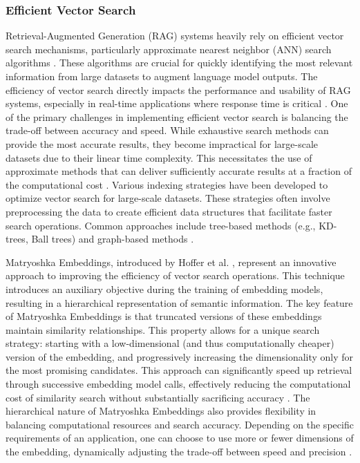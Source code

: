 \documentclass[a4paper, oneside]{discothesis}
\begin{document}
\subsubsection{Efficient Vector Search}
Retrieval-Augmented Generation (RAG) systems heavily rely on efficient vector search mechanisms, particularly approximate nearest neighbor (ANN) search algorithms \cite{johnson2019billion}. These algorithms are crucial for quickly identifying the most relevant information from large datasets to augment language model outputs. The efficiency of vector search directly impacts the performance and usability of RAG systems, especially in real-time applications where response time is critical \cite{lewis2020retrieval}.
One of the primary challenges in implementing efficient vector search is balancing the trade-off between accuracy and speed. While exhaustive search methods can provide the most accurate results, they become impractical for large-scale datasets due to their linear time complexity. This necessitates the use of approximate methods that can deliver sufficiently accurate results at a fraction of the computational cost \cite{andoni2018approximate}.
Various indexing strategies have been developed to optimize vector search for large-scale datasets. These strategies often involve preprocessing the data to create efficient data structures that facilitate faster search operations. Common approaches include tree-based methods (e.g., KD-trees, Ball trees) and graph-based methods \cite{malkov2018efficient}.

Matryoshka Embeddings, introduced by Hoffer et al. \cite{hoffer2018deep}, represent an innovative approach to improving the efficiency of vector search operations. This technique introduces an auxiliary objective during the training of embedding models, resulting in a hierarchical representation of semantic information.
The key feature of Matryoshka Embeddings is that truncated versions of these embeddings maintain similarity relationships. This property allows for a unique search strategy: starting with a low-dimensional (and thus computationally cheaper) version of the embedding, and progressively increasing the dimensionality only for the most promising candidates. This approach can significantly speed up retrieval through successive embedding model calls, effectively reducing the computational cost of similarity search without substantially sacrificing accuracy \cite{hoffer2018deep}.
The hierarchical nature of Matryoshka Embeddings also provides flexibility in balancing computational resources and search accuracy. Depending on the specific requirements of an application, one can choose to use more or fewer dimensions of the embedding, dynamically adjusting the trade-off between speed and precision \cite{hoffer2018deep}.
\end{document}
